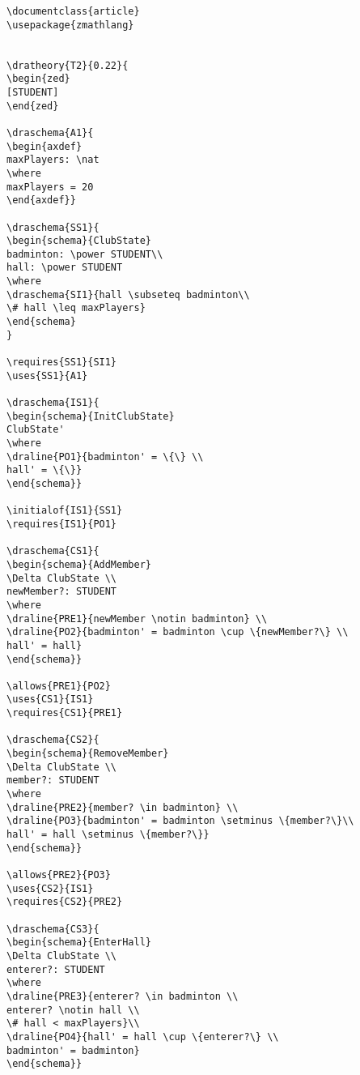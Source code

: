 \begin{verbatim}
\documentclass{article}
\usepackage{zmathlang}


\dratheory{T2}{0.22}{
\begin{zed}
[STUDENT]
\end{zed}

\draschema{A1}{
\begin{axdef}
maxPlayers: \nat
\where
maxPlayers = 20
\end{axdef}}

\draschema{SS1}{
\begin{schema}{ClubState}
badminton: \power STUDENT\\
hall: \power STUDENT
\where
\draschema{SI1}{hall \subseteq badminton\\
\# hall \leq maxPlayers}
\end{schema}
}

\requires{SS1}{SI1}
\uses{SS1}{A1}

\draschema{IS1}{
\begin{schema}{InitClubState}
ClubState'
\where
\draline{PO1}{badminton' = \{\} \\
hall' = \{\}}
\end{schema}}

\initialof{IS1}{SS1}
\requires{IS1}{PO1}

\draschema{CS1}{
\begin{schema}{AddMember}
\Delta ClubState \\
newMember?: STUDENT
\where
\draline{PRE1}{newMember \notin badminton} \\
\draline{PO2}{badminton' = badminton \cup \{newMember?\} \\
hall' = hall}
\end{schema}}

\allows{PRE1}{PO2}
\uses{CS1}{IS1}
\requires{CS1}{PRE1}

\draschema{CS2}{
\begin{schema}{RemoveMember}
\Delta ClubState \\
member?: STUDENT
\where
\draline{PRE2}{member? \in badminton} \\
\draline{PO3}{badminton' = badminton \setminus \{member?\}\\
hall' = hall \setminus \{member?\}}
\end{schema}}

\allows{PRE2}{PO3}
\uses{CS2}{IS1}
\requires{CS2}{PRE2}

\draschema{CS3}{
\begin{schema}{EnterHall}
\Delta ClubState \\
enterer?: STUDENT
\where
\draline{PRE3}{enterer? \in badminton \\
enterer? \notin hall \\
\# hall < maxPlayers}\\
\draline{PO4}{hall' = hall \cup \{enterer?\} \\
badminton' = badminton}
\end{schema}}


\end{verbatim}
